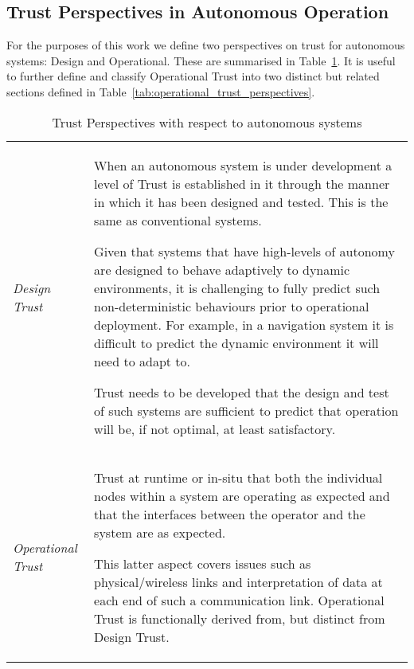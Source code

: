 \subsection{Trust Perspectives in Autonomous Operation}
For the purposes of this work we define two perspectives on trust for autonomous systems: Design and Operational.
These are summarised in Table~\ref{tab:trust_perspectives}.
It is useful to further define and classify Operational Trust into two distinct but related sections defined in Table~\ref{tab:operational_trust_perspectives}.
\begin{table}
  \begin{tabularx}{\textwidth}{p{3cm}X}\toprule
    \emph{Design Trust} & When an autonomous system is under development a level of Trust is established in it through the manner in which it has been designed and tested.
    This is the same as conventional systems.\par
    Given that systems that have high-levels of autonomy are designed to behave adaptively to dynamic environments, it is challenging to fully predict such non-deterministic behaviours prior to operational deployment.
    For example, in a navigation system it is difficult to predict the dynamic environment it will need to adapt to.\par
    Trust needs to be developed that the design and test of such systems are sufficient to predict that operation will be, if not optimal, at least satisfactory.
    \\
    \emph{Operational Trust} & Trust at runtime or in-situ that both the individual nodes within a system are operating as expected and that the interfaces between the operator and the system are as expected.
    \par
    This latter aspect covers issues such as physical/wireless links and interpretation of data at each end of such a communication link.
    Operational Trust is functionally derived from, but distinct from Design Trust.\\
    \bottomrule
  \end{tabularx}
  \caption{Trust Perspectives with respect to autonomous systems}
  \label{tab:trust_perspectives}
\end{table}
